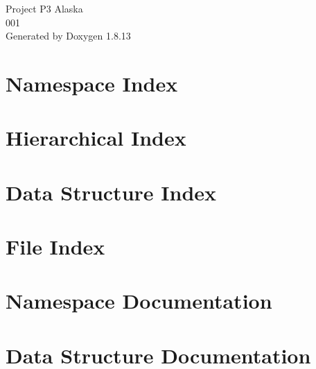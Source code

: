 \documentclass[twoside]{book}
\newcommand{\+}{\discretionary{\mbox{\scriptsize$\hookleftarrow$}}{}{}}
\newcommand{\clearemptydoublepage}{%
  \newpage{\pagestyle{empty}\cleardoublepage}%
}
\begin{document}
\begin{titlepage}
\vspace*{7cm}
\begin{center}%
{\Large Project P3 Alaska \\[1ex]\large 001 }\\
\vspace*{1cm}
{\large Generated by Doxygen 1.8.13}\\
\end{center}
\end{titlepage}
\clearemptydoublepage
{}
\tableofcontents
\clearemptydoublepage
{}

\chapter{Namespace Index}

\chapter{Hierarchical Index}

\chapter{Data Structure Index}

\chapter{File Index}

\chapter{Namespace Documentation}






\chapter{Data Structure Documentation}
















\end{document}
